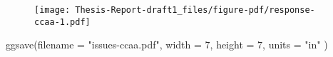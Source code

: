 \documentclass[
]{report}
\newenvironment{Shaded}{\begin{snugshade}}{\end{snugshade}}
\newcommand{\AttributeTok}[1]{\textcolor[rgb]{0.40,0.45,0.13}{#1}}
\newcommand{\DecValTok}[1]{\textcolor[rgb]{0.68,0.00,0.00}{#1}}
\newcommand{\FunctionTok}[1]{\textcolor[rgb]{0.28,0.35,0.67}{#1}}
\newcommand{\NormalTok}[1]{\textcolor[rgb]{0.00,0.23,0.31}{#1}}
\newcommand{\StringTok}[1]{\textcolor[rgb]{0.13,0.47,0.30}{#1}}
\begin{document}
\begin{figure}[H]

{\centering \texttt{[image: Thesis-Report-draft1\_files/figure-pdf/response-ccaa-1.pdf]}

}

\end{figure}

\begin{Shaded}
\begin{Highlighting}[]
\FunctionTok{ggsave}\NormalTok{(}\AttributeTok{filename =} \StringTok{"issues{-}ccaa.pdf"}\NormalTok{, }\AttributeTok{width =} \DecValTok{7}\NormalTok{, }\AttributeTok{height =} \DecValTok{7}\NormalTok{, }\AttributeTok{units =} \StringTok{"in"}\NormalTok{ )}
\end{Highlighting}
\end{Shaded}
\end{document}
